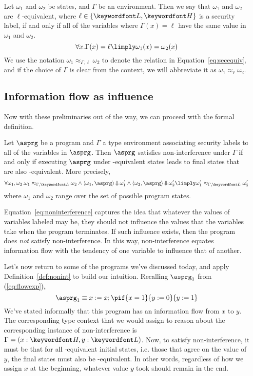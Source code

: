 \documentclass[11pt,twoside]{scrartcl}
\begin{document}
Let $\omega_1$ and $\omega_2$ be states, and $\Gamma$ be an environment. Then we say that $\omega_1$ and $\omega_2$ are $\ell$-equivalent, where $\ell \in \{\lowsec,\hisec\}$ is a security label, if and only if all of the variables where $\Gamma(x) = \ell$ have the same value in $\omega_1$ and $\omega_2$.
\begin{equation}
\label{eq:secequiv}
\forall x . \Gamma(x) = \ell \limply \omega_1(x) = \omega_2(x)
\end{equation}
We use the notation $\omega_1 \approx_{\Gamma,\ell} \omega_2$ to denote the relation in Equation~\ref{eq:secequiv}, and if the choice of $\Gamma$ is clear from the context, we will abbreviate it as $\omega_1 \approx_{\ell} \omega_2$.

\subsection{Information flow as influence}
Now with these preliminaries out of the way, we can proceed with the formal definition. 

\begin{definition}
\label{def:nonint}
Let $\asprg$ be a program and $\Gamma$ a type environment associating security labels to all of the variables in $\asprg$. Then $\asprg$ satisfies non-interference under $\Gamma$ if and only if executing $\asprg$ under \lowsec-equivalent states leads to final states that are also \lowsec-equivalent. More precisely,
\begin{equation}
\label{eq:noninterference}
\forall \omega_1,\omega_2 . \omega_1 \approx_{\Gamma,\lowsec} \omega_2 \land 
\langle \omega_1, \asprg\rangle \bigstep \omega_1' \land 
\langle \omega_2, \asprg\rangle \bigstep \omega_2'
\limply
\omega_1' \approx_{\Gamma,\lowsec} \omega_2'
\end{equation}
where $\omega_1$ and $\omega_2$ range over the set of possible program states.
\end{definition}

Equation~\ref{eq:noninterference} captures the idea that whatever the values of variables labeled \hisec may be, they should not influence the values that the \lowsec variables take when the program terminates. If such influence exists, then the program does \emph{not} satisfy non-interference. In this way, non-interference equates information flow with the tendency of one variable to influence that of another.

Let's now return to some of the programs we've discussed today, and apply Definition~\ref{def:nonint} to build our intuition. Recalling $\asprg_1$ from (\ref{eq:flowexp}),
\[
\asprg_1 \equiv x := x; \pif{x = 1}{y:=0}{y:=1}
\]
We've stated informally that this program has an information flow from $x$ to $y$. The corresponding type context that we would assign to reason about the corresponding instance of non-interference is $\Gamma = (x : \hisec, y : \lowsec)$. Now, to satisfy non-interference, it must be that for all \lowsec-equivalent initial states, i.e. those that agree on the value of $y$, the final states must also be \lowsec-equivalent. In other words, regardless of how we assign $x$ at the beginning, whatever value $y$ took should remain in the end.
\end{document}
